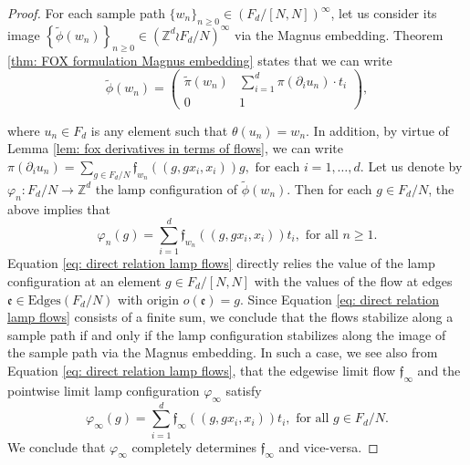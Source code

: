 \documentclass[reqno,oneside,11pt]{amsart}
\newcommand{\Z}{\mathbb{Z}}
\renewcommand{\P}{\mathbb{P}}
\theoremstyle{plain}
\theoremstyle{definition}
\begin{document}
\begin{proof}

For each sample path $\{w_n\}_{n\ge 0}\in (F_d/[N,N])^{\infty}$, let us consider its image $\left\{\widetilde{\phi}(w_n) \right\}_{n\ge 0}\in (\Z^d\wr F_d/N)^{\infty}$ via the Magnus embedding. Theorem \ref{thm: FOX formulation Magnus embedding} states that we can write
	\begin{equation*}
	\widetilde{\phi}(w_n)=\begin{pmatrix}
		\widetilde{\pi}(w_n) & \sum_{i=1}^d \pi(\partial_i u_n)\cdot t_i\\ 0 & 1
	\end{pmatrix},
\end{equation*}

where $u_n\in F_d$ is any element such that $\theta(u_n)=w_n$. In addition, by virtue of Lemma \ref{lem: fox derivatives in terms of flows}, we can write
$
\pi(\partial_i u_n)=\sum_{g\in F_d/N}\mathfrak{f}_{w_n}((g,gx_i,x_i))g, \text{ for each }i=1,\ldots,d.
$ Let us denote by $\varphi_n:F_d/N\to \Z^d$ the lamp configuration of $\widetilde{\phi}(w_n)$. Then for each $g\in F_d/N$, the above implies that
\begin{equation}\label{eq: direct relation lamp flows}
\varphi_n(g)=\sum_{i=1}^d \mathfrak{f}_{w_n}((g,gx_i,x_i))t_i, \text{ for all }n\ge 1.
\end{equation}
Equation \eqref{eq: direct relation lamp flows} directly relies the value of the lamp configuration at an element $g\in F_d/[N,N]$ with the values of the flow at edges $\mathfrak{e}\in \mathrm{Edges}(F_d/N)$ with origin $o(\mathfrak{e})=g$. Since Equation \eqref{eq: direct relation lamp flows} consists of a finite sum, we conclude that the flows stabilize along a sample path if and only if the lamp configuration stabilizes along the image of the sample path via the Magnus embedding. In such a case, we see also from Equation \eqref{eq: direct relation lamp flows}, that the edgewise limit flow $\mathfrak{f}_{\infty}$ and the pointwise limit lamp configuration $\varphi_{\infty}$ satisfy
\begin{equation*}
	\varphi_{\infty}(g)=\sum_{i=1}^d \mathfrak{f}_{\infty}((g,gx_i,x_i))t_i, \text{ for all }g\in F_d/N.
\end{equation*}
We conclude that $\varphi_{\infty}$ completely determines $\mathfrak{f}_{\infty}$ and vice-versa.
\end{proof}
\end{document}
